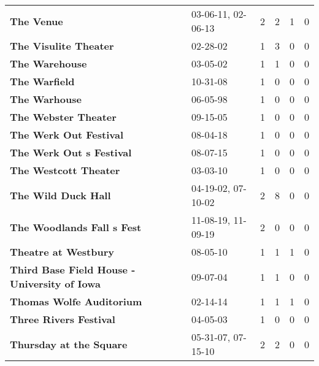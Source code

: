 \begin{supertabular}{llllll}
                                                   \textbf{The Venue} &            03-06-11, 02-06-13 &  2 &   2 &  1 &  0 \\
                                        \textbf{The Visulite Theater} &                      02-28-02 &  1 &   3 &  0 &  0 \\
                                               \textbf{The Warehouse} &                      03-05-02 &  1 &   1 &  0 &  0 \\
                                                \textbf{The Warfield} &                      10-31-08 &  1 &   0 &  0 &  0 \\
                                                \textbf{The Warhouse} &                      06-05-98 &  1 &   0 &  0 &  0 \\
                                         \textbf{The Webster Theater} &                      09-15-05 &  1 &   0 &  0 &  0 \\
                                       \textbf{The Werk Out Festival} &                      08-04-18 &  1 &   0 &  0 &  0 \\
                                     \textbf{The Werk Out s Festival} &                      08-07-15 &  1 &   0 &  0 &  0 \\
                                        \textbf{The Westcott Theater} &                      03-03-10 &  1 &   0 &  0 &  0 \\
                                          \textbf{The Wild Duck Hall} &            04-19-02, 07-10-02 &  2 &   8 &  0 &  0 \\
                                   \textbf{The Woodlands Fall s Fest} &            11-08-19, 11-09-19 &  2 &   0 &  0 &  0 \\
                                         \textbf{Theatre at Westbury} &                      08-05-10 &  1 &   1 &  1 &  0 \\
                 \textbf{Third Base Field House - University of Iowa} &                      09-07-04 &  1 &   1 &  0 &  0 \\
                                     \textbf{Thomas Wolfe Auditorium} &                      02-14-14 &  1 &   1 &  1 &  0 \\
                                       \textbf{Three Rivers Festival} &                      04-05-03 &  1 &   0 &  0 &  0 \\
                                      \textbf{Thursday at the Square} &            05-31-07, 07-15-10 &  2 &   2 &  0 &  0 \\

\end{supertabular}
